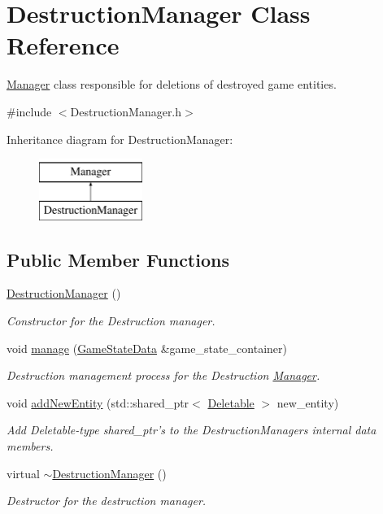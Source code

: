 \hypertarget{classDestructionManager}{\section{Destruction\-Manager Class Reference}
\label{classDestructionManager}
}


\hyperlink{classManager}{Manager} class responsible for deletions of destroyed game entities.  




{\ttfamily \#include $<$Destruction\-Manager.\-h$>$}

Inheritance diagram for Destruction\-Manager\-:\begin{figure}[H]
\begin{center}
\leavevmode
\includegraphics[height=2.000000cm]{classDestructionManager}
\end{center}
\end{figure}
\subsection*{Public Member Functions}
\begin{DoxyCompactItemize}
\item 
\hyperlink{classDestructionManager_aec752aef0eb6b659293910c011e0fe93}{Destruction\-Manager} ()
\begin{DoxyCompactList}\small\item\em Constructor for the Destruction manager. \end{DoxyCompactList}\item 
void \hyperlink{classDestructionManager_acfb0e5bf3e2d24368918b4246a972394}{manage} (\hyperlink{classGameStateData}{Game\-State\-Data} \&game\-\_\-state\-\_\-container)
\begin{DoxyCompactList}\small\item\em Destruction management process for the Destruction \hyperlink{classManager}{Manager}. \end{DoxyCompactList}\item 
void \hyperlink{classDestructionManager_a666b4ad3ae0c1383e4c9f53a48daf2ce}{add\-New\-Entity} (std\-::shared\-\_\-ptr$<$ \hyperlink{classDeletable}{Deletable} $>$ new\-\_\-entity)
\begin{DoxyCompactList}\small\item\em Add Deletable-\/type shared\-\_\-ptr's to the Destruction\-Managers internal data members. \end{DoxyCompactList}\item 
virtual \hyperlink{classDestructionManager_a0c43cc0724e29a707e5a190c7f0d6761}{$\sim$\-Destruction\-Manager} ()
\begin{DoxyCompactList}\small\item\em Destructor for the destruction manager. \end{DoxyCompactList}\end{DoxyCompactItemize}
